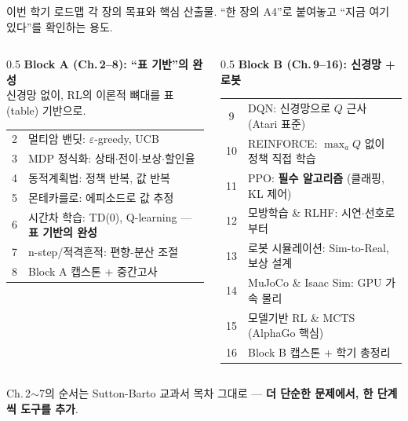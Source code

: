 \documentclass[aspectratio=169,11pt]{beamer}
\begin{document}
\begin{frame}{이번 학기 로드맵}
  각 장의 목표와 핵심 산출물. ``한 장의 A4''로 붙여놓고
  ``지금 여기 있다''를 확인하는 용도.
  \scriptsize
  \begin{columns}[T]
    \begin{column}{0.5\textwidth}
      \textbf{\color{ksablue}Block A (Ch.\,2--8): ``표 기반''의 완성} \\
      신경망 없이, RL의 이론적 뼈대를 표(table) 기반으로.
      \begin{tabular}{@{}cl@{}}
        \toprule
        2 & 멀티암 밴딧: $\varepsilon$-greedy, UCB \\
        3 & MDP 정식화: 상태$\cdot$전이$\cdot$보상$\cdot$\mbox{할인율} \\
        4 & 동적계획법: 정책 반복, 값 반복 \\
        5 & 몬테카를로: 에피소드로 값 추정 \\
        6 & 시간차 학습: TD(0), Q-learning --- \textbf{표 기반의 완성} \\
        7 & n-step/적격흔적: 편향-분산 조절 \\
        8 & Block A 캡스톤 + 중간고사 \\
        \bottomrule
      \end{tabular}
    \end{column}
    \begin{column}{0.5\textwidth}
      \textbf{\color{ksablue}Block B (Ch.\,9--16): 신경망 + 로봇} \\
      \begin{tabular}{@{}cl@{}}
        \toprule
        9 & DQN: 신경망으로 $Q$ 근사 (Atari 표준) \\
        10 & REINFORCE: $\max_a Q$ 없이 정책 직접 학습 \\
        11 & PPO: \textbf{필수 알고리즘} (클래핑, KL 제어) \\
        12 & 모방학습 \& RLHF: 시연$\cdot$선호로부터 \\
        13 & 로봇 시뮬레이션: Sim-to-Real, 보상 설계 \\
        14 & MuJoCo \& Isaac Sim: GPU 가속 물리 \\
        15 & 모델기반 RL \& MCTS (AlphaGo 핵심) \\
        16 & Block B 캡스톤 + 학기 총정리 \\
        \bottomrule
      \end{tabular}
    \end{column}
  \end{columns}
  {\footnotesize Ch.\,2$\sim$7의 순서는 Sutton-Barto 교과서 목차 그대로 ---
  \textbf{더 단순한 문제에서, 한 단계씩 도구를 추가}.}
\end{frame}
\end{document}
